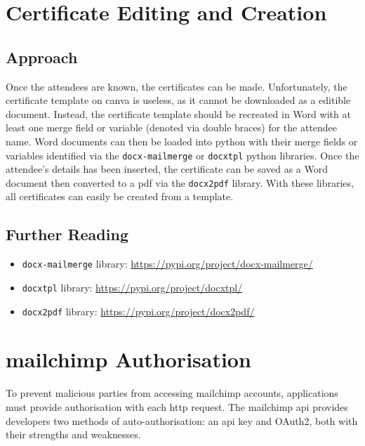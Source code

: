 \documentclass[11pt]{article}
\begin{document}
\newpage

\section{Certificate Editing and Creation}

\subsection{Approach}

Once the attendees are known, the certificates can be made. Unfortunately, the certificate template on \Gls{canva} is useless, as it cannot be downloaded as a editible document. Instead, the certificate template should be recreated in Word with at least one merge field or variable (denoted via double braces) for the attendee name. Word documents can then be loaded into \Gls{python} with their merge fields or variables identified via the \texttt{docx-mailmerge} or \texttt{docxtpl} \Gls{python} libraries. Once the attendee's details has been inserted, the certificate can be saved as a Word document then converted to a \acrshort{pdf} via the \texttt{docx2pdf} \gls{library}. With these libraries, all certificates can easily be created from a template.

\subsection{Further Reading}

\begin{itemize}
    \item \texttt{docx-mailmerge} \gls{library}: \url{https://pypi.org/project/docx-mailmerge/}
    \item \texttt{docxtpl} \gls{library}: \url{https://pypi.org/project/docxtpl/}
    \item \texttt{docx2pdf} \gls{library}: \url{https://pypi.org/project/docx2pdf/}
\end{itemize}

\newpage

\section{mailchimp Authorisation}

To prevent malicious parties from accessing \Gls{mailchimp} accounts, applications must provide authorisation with each \acrshort{http} \gls{request}. The \Gls{mailchimp} \acrshort{api} provides developers two methods of auto-authorisation: an \acrshort{api} key and OAuth2, both with their strengths and weaknesses.
\end{document}
